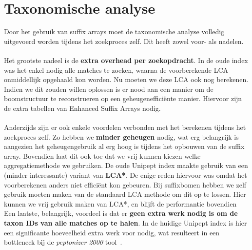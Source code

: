 \section{Taxonomische analyse}\label{sec:taxonomische-analyse}
Door het gebruik van suffix arrays moet de taxonomische analyse volledig uitgevoerd worden tijdens het zoekproces zelf.
Dit heeft zowel voor- als nadelen.
\\ \\
Het grootste nadeel is de \textbf{extra overhead per zoekopdracht}.
In de oude index was het enkel nodig alle matches te zoeken, waarna de voorberekende LCA onmiddellijk opgehaald kon worden.
Nu moeten we deze LCA ook nog berekenen.
Indien we dit zouden willen oplossen is er nood aan een manier om de boomstructuur te reconstrueren op een geheugenefficiënte manier.
Hiervoor zijn de extra tabellen van Enhanced Suffix Arrays nodig.
\\ \\
Anderzijds zijn er ook enkele voordelen verbonden met het berekenen tijdens het zoekproces zelf.
Zo hebben we \textbf{minder geheugen} nodig, wat erg belangrijk is aangezien het geheugengebruik al erg hoog is tijdens het opbouwen van de suffix array.
Bovendien laat dit ook toe dat we vrij kunnen kiezen welke aggregatiemethode we gebruiken.
De oude Unipept index maakte gebruik van een (minder interessante) variant van \textbf{LCA*}.
De enige reden hiervoor was omdat het voorberekenen anders niet efficiënt kon gebeuren.
Bij suffixbomen hebben we zelf gebruik moeten maken van de standaard LCA methode om dit op te lossen.
Hier kunnen we vrij gebruik maken van LCA*, en blijft de performantie bovendien
Een laatste, belangrijk, voordeel is dat er \textbf{geen extra werk nodig is om de taxon IDs van alle matches op te halen}.
In de huidige Unipept index is hier een significante hoeveelheid extra werk voor nodig, wat resulteert in een bottleneck bij de \textit{peptonizer 2000} tool~\cite{pep_gm}.


